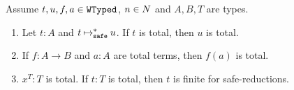 \begin{lemma}\label{lem:total_value-finiteness}
  Assume $t,u,f,a \in {\tt WTyped}$, $n \in {N}$ and $A,B,T$ are types.
  \begin{enumerate}
  \item
    \label{lem:total_value-finiteness1}
    Let $t:A$ and $t \mathbin{\mathbin{\mapsto}_{\hbox{\scriptsize \tt safe}}^*} u$.
    If $t$ is total, then $u$ is total.
  \item
    \label{lem:total_value-finiteness2}
    If $f:A \rightarrow B$ and $a:A$ are total terms, then $f(a)$ is total.
  \item
    \label{lem:total_value-finiteness2bis}
    $x^T:T$ is total. If $t:T$ is total, then $t$ is  finite for safe-reductions.
  \end{enumerate}
\end{lemma}
